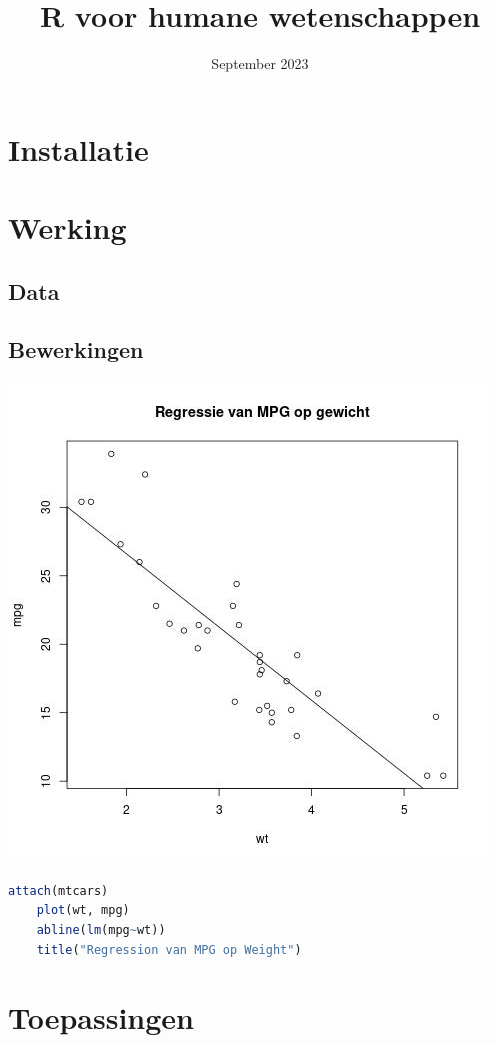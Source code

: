 \documentclass[a4paper,12pt, dutch, oneside ]{book}
\begin{document}
\title{R voor humane wetenschappen}
\date{September 2023}

\maketitle
\tableofcontents

\chapter{Installatie}

%

\chapter{Werking}


\section{Data}

\section{Bewerkingen}
\includegraphics[scale=.5]{ren.jpeg}
\begin{lstlisting}[language=R]
    attach(mtcars)
    plot(wt, mpg)
    abline(lm(mpg~wt))
    title("Regression van MPG op Weight")
\end{lstlisting}


\chapter{Toepassingen}
\end{document}
